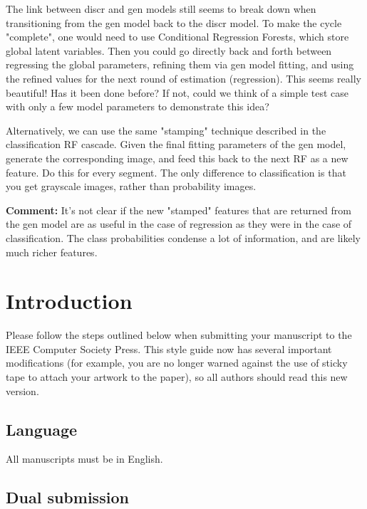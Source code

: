 \documentclass[10pt,twocolumn,letterpaper]{article}
\begin{document}
The link between discr and gen models still seems to break down when transitioning from the gen model back to the discr model.  To make the cycle "complete", one would need to use Conditional Regression Forests, which store global latent variables. Then you could go directly back and forth between regressing the global parameters, refining them via gen model fitting, and using the refined values for the next round of estimation (regression).  This seems really beautiful!  Has it been done before?  If not, could we think of a simple test case with only a few model parameters to demonstrate this idea?

Alternatively, we can use the same "stamping" technique described in the classification RF cascade.  Given the final fitting parameters of the gen model, generate the corresponding image, and feed this back to the next RF as a new feature.  Do this for every segment.  The only difference to classification is that you get grayscale images, rather than probability images.

\textbf{Comment:} It's not clear if the new "stamped" features that are returned from the gen model are as useful in the case of regression as they were in the case of classification.  The class probabilities condense a lot of information, and are likely much richer features.









\section{Introduction}

Please follow the steps outlined below when submitting your manuscript to
the IEEE Computer Society Press.  This style guide now has several
important modifications (for example, you are no longer warned against the
use of sticky tape to attach your artwork to the paper), so all authors
should read this new version.

\subsection{Language}

All manuscripts must be in English.

\subsection{Dual submission}
\end{document}
